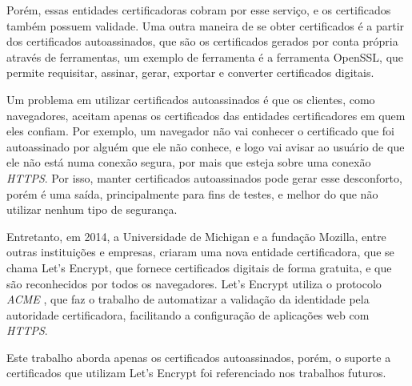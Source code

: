 Porém, essas entidades certificadoras cobram por esse serviço, e os certificados também
possuem validade. Uma outra maneira de se obter certificados é a partir dos certificados
autoassinados, que são os certificados gerados por conta própria através de
ferramentas, um exemplo de ferramenta é a ferramenta OpenSSL, que permite requisitar,
assinar, gerar, exportar e converter certificados digitais.

Um problema em utilizar certificados autoassinados é que os clientes, como navegadores,
aceitam apenas os certificados das entidades certificadores em quem eles confiam. Por
exemplo, um navegador não vai conhecer o certificado que foi autoassinado por
alguém que ele não conhece, e logo vai avisar ao usuário de que ele não está numa
conexão segura, por mais que esteja sobre uma conexão \textit{HTTPS}. Por isso, 
manter certificados
autoassinados pode gerar esse desconforto, porém é uma saída, principalmente para
fins de testes, e melhor do que não utilizar nenhum tipo de segurança.

Entretanto, em 2014, a Universidade de Michigan e a fundação Mozilla, entre outras 
instituições e empresas, criaram uma nova entidade certificadora, que se chama 
Let's Encrypt, que fornece certificados digitais de forma gratuita, e que são 
reconhecidos por todos os navegadores. Let's Encrypt utiliza o protocolo \textit{ACME} \cite{ACME}, que faz o trabalho de automatizar a validação da identidade pela autoridade 
certificadora, facilitando a configuração de aplicações web com \textit{HTTPS}. 

Este trabalho aborda apenas os certificados autoassinados, porém, o suporte
a certificados que utilizam Let's Encrypt foi referenciado nos trabalhos futuros.
